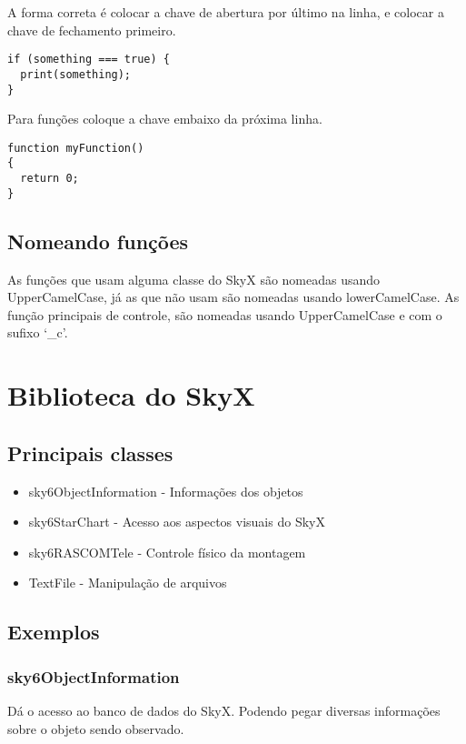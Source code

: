\documentclass{article}
\begin{document}
A forma correta é colocar a chave de abertura por último na linha, e colocar a chave de fechamento primeiro.

\begin{lstlisting}
if (something === true) {
  print(something);
}
\end{lstlisting}

Para funções coloque a chave embaixo da próxima linha.

\begin{lstlisting}
function myFunction()
{
  return 0;
}
\end{lstlisting}

\subsection{Nomeando funções}

As funções que usam alguma classe do SkyX são nomeadas usando UpperCamelCase, já as que não usam são nomeadas usando lowerCamelCase. As função principais de controle, são nomeadas usando UpperCamelCase e com o sufixo `\_c'.

\section{Biblioteca do SkyX}

\subsection{Principais classes}

\begin{itemize}
    \item sky6ObjectInformation - Informações dos objetos
    \item sky6StarChart - Acesso aos aspectos visuais do SkyX
    \item sky6RASCOMTele - Controle físico da montagem
    \item TextFile - Manipulação de arquivos
\end{itemize}

\subsection{Exemplos}

\subsubsection{sky6ObjectInformation}

Dá o acesso ao banco de dados do SkyX. Podendo pegar diversas informações sobre o objeto sendo observado.
\end{document}
